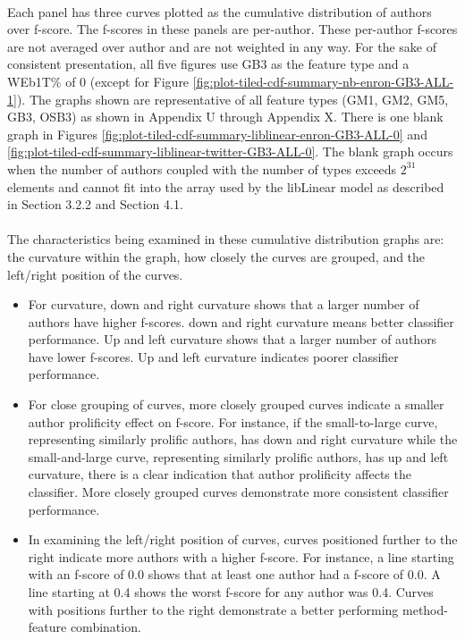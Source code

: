 	\paragraph*{}Each panel has three curves plotted as the cumulative distribution of authors over f-score.  The f-scores in these panels are per-author. These per-author f-scores are not averaged over author and are not weighted in any way.  For the sake of consistent presentation, all five figures use GB3 as the feature type and a WEb1T\% of 0 (except for Figure \ref{fig:plot-tiled-cdf-summary-nb-enron-GB3-ALL-1}).  The graphs shown are representative of all feature types (GM1, GM2, GM5, GB3, OSB3) as shown in Appendix U through Appendix X. There is one blank graph in Figures \ref{fig:plot-tiled-cdf-summary-liblinear-enron-GB3-ALL-0} and \ref{fig:plot-tiled-cdf-summary-liblinear-twitter-GB3-ALL-0}.  The blank graph occurs when the number of authors coupled with the number of types exceeds $2^{31}$ elements and cannot fit into the array used by the libLinear model as described in Section 3.2.2 and Section 4.1.
	
	\paragraph*{} The characteristics being examined in these cumulative distribution graphs are: the curvature within the graph, how closely the curves are grouped, and the left/right position of the curves.  
	\begin{itemize}
		\item For curvature, down and right curvature shows that a larger number of authors have higher f-scores. down and right curvature means better classifier performance. Up and left curvature shows that a larger number of authors have lower f-scores.  Up and left curvature indicates poorer classifier performance.
		\item For close grouping of curves, more closely grouped curves indicate a smaller author prolificity effect on f-score.  For instance, if the small-to-large curve, representing similarly prolific authors, has down and right curvature while the small-and-large curve, representing similarly prolific authors, has up and left curvature, there is a clear indication that author prolificity affects the classifier.  More closely grouped curves demonstrate more consistent classifier performance.
		\item In examining the left/right position of curves, curves positioned further to the right indicate more authors with a higher f-score. For instance, a line starting with an f-score of 0.0 shows that at least one author had a f-score of 0.0.  A line starting at 0.4 shows the worst f-score for any author was 0.4.  Curves with positions further to the right demonstrate a better performing method-feature combination.
	\end{itemize}

